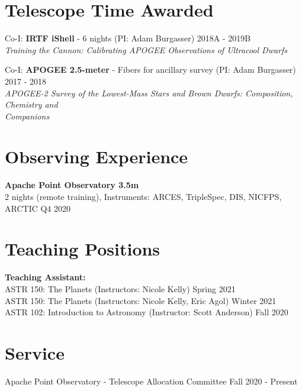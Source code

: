 \documentclass[margin,line]{resume}
\begin{document}
\begin{resume}

\section{\mysidestyle \textcolor{bcolor}{Telescope Time Awarded}}
Co-I: \textbf{IRTF iShell} - 6 nights (PI: Adam Burgasser) \hfill 2018A - 2019B \\ 
\textsl{Training the Cannon: Calibrating APOGEE Observations of Ultracool Dwarfs} 

Co-I: \textbf{APOGEE 2.5-meter} - Fibers for ancillary survey (PI: Adam Burgasser) \hfill 2017 - 2018 \\
\textsl{APOGEE-2 Survey of the Lowest-Mass Stars and Brown Dwarfs: Composition, Chemistry and \\ Companions}



\section{\mysidestyle \textcolor{bcolor}{Observing Experience}}
\textbf{Apache Point Observatory 3.5m}  \\
2 nights (remote training), Instruments: ARCES, TripleSpec, DIS, NICFPS, ARCTIC \hfill Q4 2020


\section{\mysidestyle \textcolor{bcolor}{Teaching Positions}}
\textbf{Teaching Assistant:} \\
ASTR 150: The Planets (Instructors: Nicole Kelly) \hfill Spring 2021  \\
ASTR 150: The Planets (Instructors: Nicole Kelly, Eric Agol) \hfill Winter 2021  \\
ASTR 102: Introduction to Astronomy (Instructor: Scott Anderson) \hfill Fall 2020 


\section{\mysidestyle \textcolor{bcolor}{Service}}
Apache Point Observatory - Telescope Allocation Committee \hfill Fall 2020 - Present



\end{resume}
\end{document}
